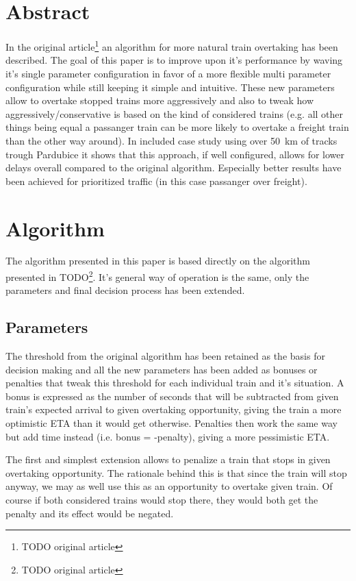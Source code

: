 \documentclass[\languages,a4paper,12pt]{article}
\title{\documenttitle}
\date{\documentdate}
\author{\documentauthor}
\newcommand{\unnumberedsection}[1]{%
	\section*{#1}
	\phantomsection\addcontentsline{toc}{section}{#1}
}
\begin{document}
\maketitle

\unnumberedsection{Abstract}

In the original article\footnote{TODO original article} an algorithm for more natural train overtaking has been described.
The goal of this paper is to improve upon it's performance by waving it's single parameter configuration in favor of a more flexible multi parameter configuration while still keeping it simple and intuitive.
These new parameters allow to overtake stopped trains more aggressively and also to tweak how aggressively/conservative is based on the kind of considered trains (e.g. all other things being equal a passanger train can be more likely to overtake a freight train than the other way around).
In included case study using over \SI{50}{\km} of tracks trough Pardubice it shows that this approach, if well configured, allows for lower delays overall compared to the original algorithm.
Especially better results have been achieved for prioritized traffic (in this case passanger over freight).

\section{Algorithm}

The algorithm presented in this paper is based directly on the algorithm presented in TODO\footnote{TODO original article}.
It's general way of operation is the same, only the parameters and final decision process has been extended.

\subsection{Parameters}

The threshold from the original algorithm has been retained as the basis for decision making and all the new parameters has been added as bonuses or penalties that tweak this threshold for each individual train and it's situation.
A bonus is expressed as the number of seconds that will be subtracted from given train's expected arrival to given overtaking opportunity, giving the train a more optimistic ETA than it would get otherwise.
Penalties then work the same way but add time instead (i.e. bonus = -penalty), giving a more pessimistic ETA.

The first and simplest extension allows to penalize a train that stops in given overtaking opportunity.
The rationale behind this is that since the train will stop anyway, we may as well use this as an opportunity to overtake given train.
Of course if both considered trains would stop there, they would both get the penalty and its effect would be negated.
\end{document}
